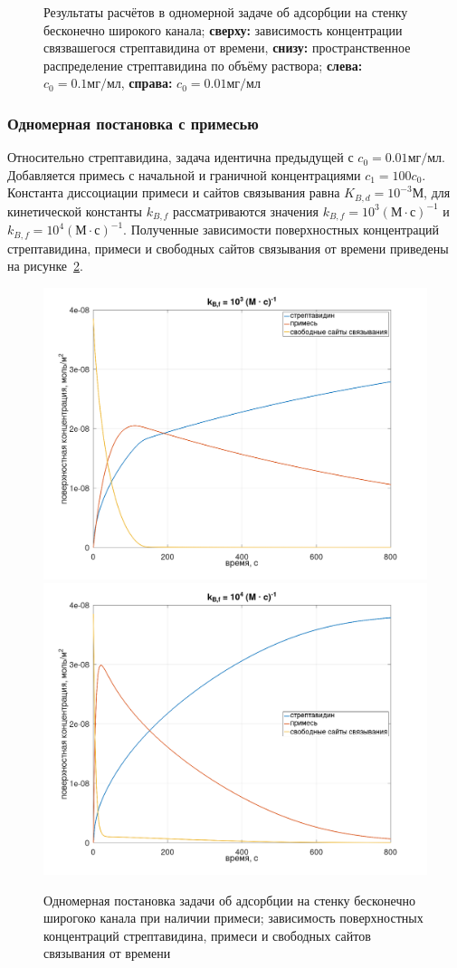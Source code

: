 \documentclass[oneside,final,12pt]{extreport}
\begin{document}
\begin{figure}
  \caption{\label{fig:flat_wide_onecomp_onedim_probe_distrib}%
    Результаты расчётов в одномерной задаче об адсорбции
    на стенку бесконечно широкого канала;
    \textbf{сверху:} зависимость концентрации связвашегося стрептавидина от времени,
    \textbf{снизу:} пространственное распределение стрептавидина по объёму раствора;
    \textbf{слева:} $c_0 = 0.1 \text{мг}/\text{мл}$,
    \textbf{справа:} $c_0 = 0.01 \text{мг}/\text{мл}$
  }

\end{figure}

\subsubsection*{Одномерная постановка с примесью}
Относительно стрептавидина, задача идентична предыдущей
с $c_0 = 0.01 \text{мг}/\text{мл}$.
Добавляется примесь с начальной и граничной концентрациями
$c_1 = 100 c_0$.
Константа диссоциации примеси и сайтов связывания равна
$K_{B,d} = 10^{-3} \text{М}$,
для кинетической константы $k_{B,f}$ рассматриваются значения
$k_{B,f} = 10^3 \left(\text{М} \cdot \text{с}\right)^{-1}$ и
$k_{B,f} = 10^4 \left(\text{М} \cdot \text{с}\right)^{-1}$.
Полученные зависимости поверхностных концентраций
стрептавидина, примеси и свободных сайтов связывания от времени
приведены на рисунке~\ref{fig:flat_wide_twobulk_paramsweep}.

\begin{figure}
  \centering
  \includegraphics[width=.6\textwidth]{pic/flat_wide_two_bulk_paramsweep_3}
  \includegraphics[width=.6\textwidth]{pic/flat_wide_two_bulk_paramsweep_4}

  \caption{%
    \label{fig:flat_wide_twobulk_paramsweep}%
    Одномерная постановка задачи об адсорбции на стенку бесконечно широгоко канала
    при наличии примеси;
    зависимость поверхностных концентраций стрептавидина, примеси и
    свободных сайтов связывания от времени
  }
\end{figure}
\end{document}
